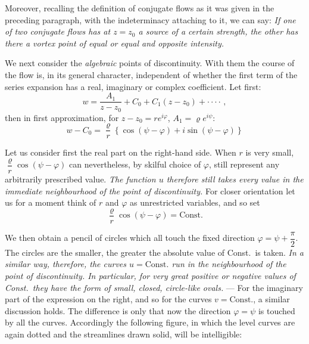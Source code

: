 \documentclass{article}
\begin{document}
Moreover, recalling the definition of conjugate flows as it was given in the preceding paragraph, with the indeterminacy attaching to it, we can say: \emph{If one of two conjugate flows has at $z = z_{0}$ a source of a certain strength, the other has there a vortex point of equal or equal and opposite intensity.}

We next consider the \emph{algebraic} points of discontinuity. With them the course of the flow is, in its general character, independent of whether the first term of the series expansion has a real, imaginary or complex coefficient. Let first:
\[ w = \frac{A_{1}}{z - z_{0}} + C_{0} + C_{1} (z - z_{0}) + \cdot\cdot\cdot\cdot\,, \]
then in first approximation, for $z - z_{0} = re^{i\varphi}$, $A_{1} = \varrho e^{i\psi}$:
\[ w - C_{0} = \frac{\varrho}{r} \left\{ \cos (\psi - \varphi) + i \sin (\psi - \varphi) \right\} \]


Let us consider first the real part on the right-hand side. When $r$ is very small, $\dfrac{\varrho}{r} \cos (\psi - \varphi)$ can nevertheless, by skilful choice of $\varphi$, still represent any arbitrarily prescribed value. \emph{The function $u$ therefore still takes every value in the immediate neighbourhood of the point of discontinuity.} For closer orientation let us for a moment think of $r$ and $\varphi$ as unrestricted variables, and so set
\[ \frac{\varrho}{r} \cos (\psi - \varphi) = \text{Const.} \]

We then obtain a pencil of circles which all touch the fixed direction $\varphi = \psi + \dfrac{\pi}{2}$. The circles are the smaller, the greater the absolute value of Const.\ is taken. \emph{In a similar way, therefore, the curves $u = \text{Const.}$ run in the neighbourhood of the point of discontinuity. In particular, for very great positive or negative values of Const.\ they have the form of small, closed, circle-like ovals.} --- For the imaginary part of the expression on the right, and so for the curves $v = \text{Const.}$, a similar discussion holds. The difference is only that now the direction $\varphi = \psi$ is touched by all the curves. Accordingly the following figure, in which the level curves are again dotted and the streamlines drawn solid, will be intelligible:

\end{document}
